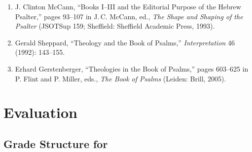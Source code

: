 \documentclass[titlepage]{article}
\begin{document}
\begin{enumerate}
 \item J. Clinton McCann, “Books I–III and the Editorial Purpose of the Hebrew Psalter,” pages 93–107 in J.\,C. McCann, ed., \emph{The Shape and Shaping of the Psalter} (JSOTSup 159; Sheffield: Sheffield Academic Press, 1993).
 \item Gerald Sheppard, “Theology and the Book of Psalms,” \emph{Interpretation} 46 (1992): 143–155.
 \item Erhard Gerstenberger, “Theologies in the Book of Psalms,” pages 603–625 in P. Flint and P. Miller, eds., \emph{The Book of Psalms} (Leiden: Brill, 2005).
\end{enumerate}

\section{Evaluation}
\label{evaluation}

\subsection{Grade Structure for \ccode}
\label{structure}

\end{document}
